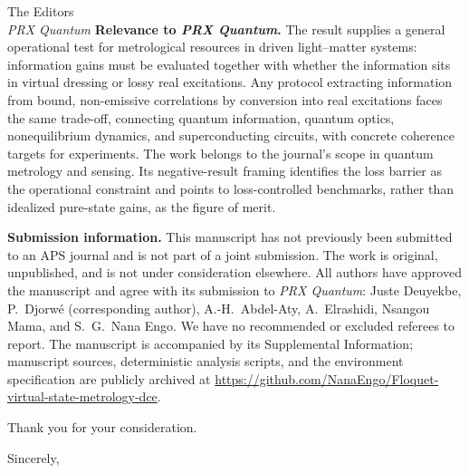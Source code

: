 \documentclass[11pt,a4paper]{letter}
\begin{document}
\begin{letter}{The Editors\\ \textit{PRX Quantum}}
\textbf{Relevance to \textit{PRX Quantum}.} The result supplies a general operational test for metrological resources in driven light--matter systems: information gains must be evaluated together with whether the information sits in virtual dressing or lossy real excitations. Any protocol extracting information from bound, non-emissive correlations by conversion into real excitations faces the same trade-off, connecting quantum information, quantum optics, nonequilibrium dynamics, and superconducting circuits, with concrete coherence targets for experiments. The work belongs to the journal's scope in quantum metrology and sensing. Its negative-result framing identifies the loss barrier as the operational constraint and points to loss-controlled benchmarks, rather than idealized pure-state gains, as the figure of merit.

\textbf{Submission information.} This manuscript has not previously been submitted to an APS journal and is not part of a joint submission. The work is original, unpublished, and is not under consideration elsewhere. All authors have approved the manuscript and agree with its submission to \textit{PRX Quantum}: Juste Deuyekbe, P.~Djorw\'e (corresponding author), A.-H.~Abdel-Aty, A.~Elrashidi, Nsangou Mama, and S.~G.~Nana Engo. We have no recommended or excluded referees to report. The manuscript is accompanied by its Supplemental Information; manuscript sources, deterministic analysis scripts, and the environment specification are publicly archived at \url{https://github.com/NanaEngo/Floquet-virtual-state-metrology-dce}.

Thank you for your consideration.

\closing{Sincerely,}

\end{letter}
\end{document}
